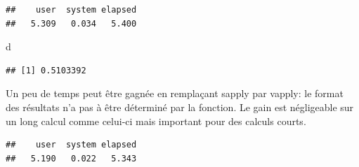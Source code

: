 \documentclass[
  11pt,
  french,
  a4paper,
  extrafontsizes,onecolumn,openright
  ]{memoir}
\newenvironment{Shaded}{\begin{snugshade}}{\end{snugshade}}
\newcommand{\ControlFlowTok}[1]{\textcolor[rgb]{0.13,0.29,0.53}{\textbf{#1}}}
\newcommand{\DecValTok}[1]{\textcolor[rgb]{0.00,0.00,0.81}{#1}}
\newcommand{\FunctionTok}[1]{\textcolor[rgb]{0.00,0.00,0.00}{#1}}
\newcommand{\NormalTok}[1]{#1}
\newcommand{\OtherTok}[1]{\textcolor[rgb]{0.56,0.35,0.01}{#1}}
\newcommand{\SpecialCharTok}[1]{\textcolor[rgb]{0.00,0.00,0.00}{#1}}
\begin{document}
\begin{verbatim}
##    user  system elapsed 
##   5.309   0.034   5.400
\end{verbatim}

\begin{Shaded}
\begin{Highlighting}[]
\NormalTok{d}
\end{Highlighting}
\end{Shaded}

\begin{verbatim}
## [1] 0.5103392
\end{verbatim}

\normalsize

Un peu de temps peut être gagnée en remplaçant sapply par vapply: le format des résultats n'a pas à être déterminé par la fonction.
Le gain est négligeable sur un long calcul comme celui-ci mais important pour des calculs courts.

\scriptsize

\begin{Shaded}
\end{Shaded}

\begin{verbatim}
##    user  system elapsed 
##   5.190   0.022   5.343
\end{verbatim}
\end{document}

